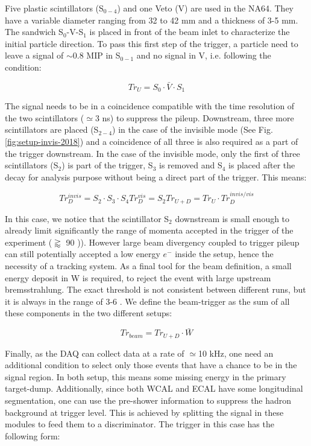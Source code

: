 Five plastic scintillators (S$_{0-4}$) and one Veto (V) are used in the NA64. They have a variable diameter ranging from 32 to 42 \si{mm} and a thickness of 3-5 \si{mm}. The sandwich S$_0$-V-S$_1$ is placed in front of the beam inlet to characterize the initial particle direction. To pass this first step of the trigger, a particle need to leave a signal of $\sim$0.8 MIP in S$_{0-1}$ and no signal in V, i.e. following the condition:

\begin{equation}
\label{eq:trigger-upstream}
Tr_U = S_0 \cdot \bar{V} \cdot S_1
\end{equation}

The signal needs to be in a coincidence compatible with the time resolution of the two scintillators ($\simeq$3 \si{ns}) to suppress the pileup. Downstream, three more scintillators are placed (S$_{2-4}$) in the case of the invisible mode (See Fig.\ref{fig:setup-invis-2018}) and a coincidence of all three is also required as a part of the trigger downstream. In the case of the invisible mode, only the first of three scintillators (S$_2$) is part of the trigger, S$_3$ is removed and S$_4$ is placed after the decay for analysis purpose without being a direct part of the trigger. This means:

\begin{equation}
\label{eq:trigger-downstream}
Tr^{invis}_D = S_2 \cdot S_3 \cdot S_4
Tr^{vis}_D = S_2
Tr_{U+D} = Tr_U \cdot Tr^{invis/vis}_D
\end{equation}

In this case, we notice that the scintillator S$_2$ downstream is small enough to already limit significantly the range of momenta accepted in the trigger of the experiment ($\gtrapprox$ 90 \si{\gev})). However large beam divergency coupled to trigger pileup can still potentially accepted a low energy $e^-$ inside the setup, hence the necessity of a tracking system. As a final tool for the beam definition, a small energy deposit in W is required, to reject the event with large upstream bremsstrahlung. The exact threshold is not consistent between different runs, but it is always in the range of 3-6 \si{\gev}. We define the beam-trigger as the sum of all these components in the two different setups:

\begin{equation}
\label{eq:trigger-beam}
Tr_{beam} = Tr_{U+D} \cdot \bar{W}
\end{equation}

Finally, as the DAQ can collect data at a rate of $\simeq$10 \si{kHz}, one need an additional condition to select only those events that have a chance to be in the signal region. In both setup, this means some missing energy in the primary target-dump. Additionally, since both WCAL and ECAL have some longitudinal segmentation, one can use the pre-shower information to suppress the hadron background at trigger level. This is achieved by splitting the signal in these modules to feed them to a discriminator. The trigger in this case has the following form:

